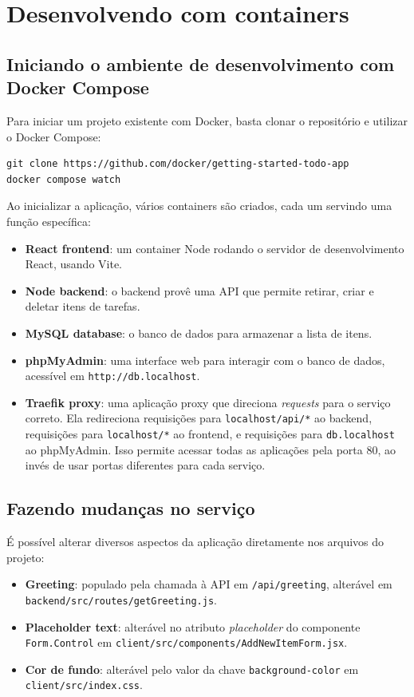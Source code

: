 \section{Desenvolvendo com containers}

\subsection{Iniciando o ambiente de desenvolvimento com Docker Compose}

Para iniciar um projeto existente com Docker, basta clonar o repositório e utilizar o Docker Compose:

\begin{verbatim}
git clone https://github.com/docker/getting-started-todo-app
docker compose watch
\end{verbatim}

Ao inicializar a aplicação, vários containers são criados, cada um servindo uma função específica:

\begin{itemize}
    \item \textbf{React frontend}: um container Node rodando o servidor de desenvolvimento React, usando Vite.
    \item \textbf{Node backend}: o backend provê uma API que permite retirar, criar e deletar itens de tarefas.
    \item \textbf{MySQL database}: o banco de dados para armazenar a lista de itens.
    \item \textbf{phpMyAdmin}: uma interface web para interagir com o banco de dados, acessível em \texttt{http://db.localhost}.
    \item \textbf{Traefik proxy}: uma aplicação proxy que direciona \textit{requests} para o serviço correto. Ela redireciona requisições para \texttt{localhost/api/*} ao backend, requisições para \texttt{localhost/*} ao frontend, e requisições para \texttt{db.localhost} ao phpMyAdmin. Isso permite acessar todas as aplicações pela porta 80, ao invés de usar portas diferentes para cada serviço.
\end{itemize}

\subsection{Fazendo mudanças no serviço}

É possível alterar diversos aspectos da aplicação diretamente nos arquivos do projeto:

\begin{itemize}
    \item \textbf{Greeting}: populado pela chamada à API em \texttt{/api/greeting}, alterável em \texttt{backend/src/routes/getGreeting.js}.
    \item \textbf{Placeholder text}: alterável no atributo \textit{placeholder} do componente \texttt{Form.Control} em \texttt{client/src/components/AddNewItemForm.jsx}.
    \item \textbf{Cor de fundo}: alterável pelo valor da chave \texttt{background-color} em \texttt{client/src/index.css}.
\end{itemize}

